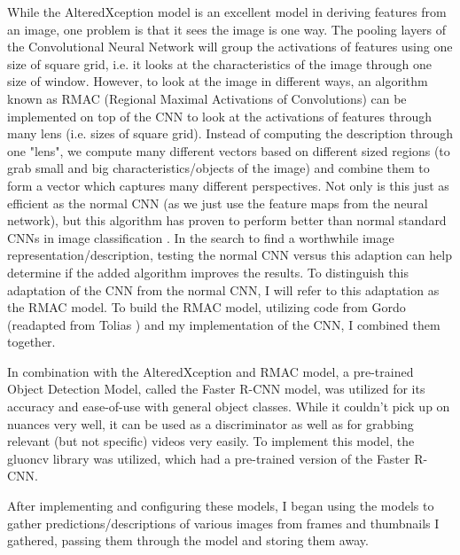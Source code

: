 \documentclass[10pt,twocolumn]{article}
\begin{document}
While the AlteredXception model is an excellent model in deriving features from an image, one problem is that it sees the image is one way. The pooling layers of the Convolutional Neural Network will group the activations of features using one size of square grid, i.e. it looks at the characteristics of the image through one size of window. However, to look at the image in different ways, an algorithm known as RMAC (Regional Maximal Activations of Convolutions) can be implemented on top of the CNN to look at the activations of features through many lens (i.e. sizes of square grid). Instead of computing the description through one "lens", we compute many different vectors based on different sized regions (to grab small and big characteristics/objects of the image) and combine them to form a vector which captures many different perspectives. Not only is this just as efficient as the normal CNN (as we just use the feature maps from the neural network), but this algorithm has proven to perform better than normal standard CNNs in image classification \cite{Tolias2016}. In the search to find a worthwhile image representation/description, testing the normal CNN versus this adaption can help determine if the added algorithm improves the results. To distinguish this adaptation of the CNN from the normal CNN, I will refer to this adaptation as the RMAC model. To build the RMAC model, utilizing code from Gordo \cite{Gordo2016} (readapted from Tolias \cite{Tolias2016}) and my implementation of the CNN, I combined them together.

In combination with the AlteredXception and RMAC model, a pre-trained Object Detection Model, called the Faster R-CNN model, was utilized for its accuracy and ease-of-use with general object classes. While it couldn't pick up on nuances very well, it can be used as a discriminator as well as for grabbing relevant (but not specific) videos very easily. To implement this model, the gluoncv library was utilized, which had a pre-trained version of the Faster R-CNN.

After implementing and configuring these models, I began using the models to gather predictions/descriptions of various images from frames and thumbnails I gathered, passing them through the model and storing them away.
\end{document}
